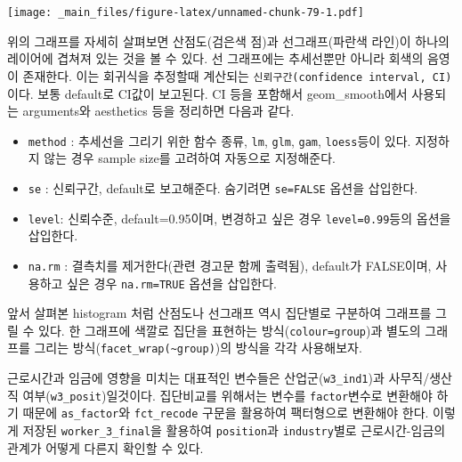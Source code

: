 \documentclass[
]{book}
\providecommand{\tightlist}{%
  \setlength{\itemsep}{0pt}\setlength{\parskip}{0pt}}
\theoremstyle{definition}
\theoremstyle{definition}
\theoremstyle{definition}
\theoremstyle{definition}
\theoremstyle{remark}
\begin{document}
\texttt{[image: \_main\_files/figure-latex/unnamed-chunk-79-1.pdf]}

위의 그래프를 자세히 살펴보면 산점도(검은색 점)과 선그래프(파란색 라인)이 하나의 레이어에 겹쳐져 있는 것을 볼 수 있다. 선 그래프에는 추세선뿐만 아니라 회색의 음영이 존재한다. 이는 회귀식을 추정할때 계산되는 \texttt{신뢰구간(confidence\ interval,\ CI)}이다. 보통 default로 CI값이 보고된다. CI 등을 포함해서 geom\_smooth에서 사용되는 arguments와 aesthetics 등을 정리하면 다음과 같다.

\begin{itemize}
\tightlist
\item
  \texttt{method} : 추세선을 그리기 위한 함수 종류, \texttt{lm}, \texttt{glm}, \texttt{gam}, \texttt{loess}등이 있다. 지정하지 않는 경우 sample size를 고려하여 자동으로 지정해준다.
\item
  \texttt{se} : 신뢰구간, default로 보고해준다. 숨기려면 \texttt{se=FALSE} 옵션을 삽입한다.
\item
  \texttt{level}: 신뢰수준, default=0.95이며, 변경하고 싶은 경우 \texttt{level=0.99}등의 옵션을 삽입한다.\\
\item
  \texttt{na.rm} : 결측치를 제거한다(관련 경고문 함께 출력됨), default가 FALSE이며, 사용하고 싶은 경우 \texttt{na.rm=TRUE} 옵션을 삽입한다.
\end{itemize}

앞서 살펴본 histogram 처럼 산점도나 선그래프 역시 집단별로 구분하여 그래프를 그릴 수 있다. 한 그래프에 색깔로 집단을 표현하는 방식(\texttt{colour=group})과 별도의 그래프를 그리는 방식(\texttt{facet\_wrap(\textasciitilde{}group)})의 방식을 각각 사용해보자.

근로시간과 임금에 영향을 미치는 대표적인 변수들은 산업군(\texttt{w3\_ind1})과 사무직/생산직 여부(\texttt{w3\_posit})일것이다. 집단비교를 위해서는 변수를 \texttt{factor}변수로 변환해야 하기 때문에 \texttt{as\_factor}와 \texttt{fct\_recode} 구문을 활용하여 팩터형으로 변환해야 한다. 이렇게 저장된 \texttt{worker\_3\_final}을 활용하여 \texttt{position}과 \texttt{industry}별로 근로시간-임금의 관계가 어떻게 다른지 확인할 수 있다.
\end{document}
